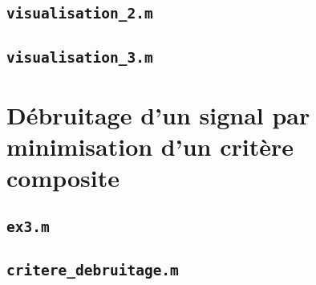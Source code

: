 \documentclass[12pt,a4paper,titlepage]{article}
\begin{document}
\begin{appendices}
    \subsection{\texttt{visualisation\_2.m}}

    

    \subsection{\texttt{visualisation\_3.m}}

    

    \section{Débruitage d'un signal par minimisation d'un critère composite}

    \subsection{\texttt{ex3.m}}

    

    \subsection{\texttt{critere\_debruitage.m}}

    

\end{appendices}
\end{document}
